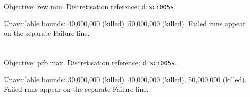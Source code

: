 \documentclass[a4paper,10pt]{article}
\begin{document}
\noindent\begin{minipage}{\linewidth}
\section*{\small\texttt{}}
Objective: rew min. Discretisation reference: \texttt{discr005s}.

\begin{minipage}[t]{0.48\linewidth}\centering

\end{minipage}
\hfill
\begin{minipage}[t]{0.48\linewidth}\centering

\end{minipage}
\par\medskip
Unavailable bounds: 40,000,000 (killed), 50,000,000 (killed). Failed runs appear on the separate Failure line.

\end{minipage}\par\bigskip
\noindent\begin{minipage}{\linewidth}
\section*{\small\texttt{}}
Objective: prb max. Discretisation reference: \texttt{discr005s}.

\begin{minipage}[t]{0.48\linewidth}\centering

\end{minipage}
\hfill
\begin{minipage}[t]{0.48\linewidth}\centering

\end{minipage}
\par\medskip
Unavailable bounds: 30,000,000 (killed), 40,000,000 (killed), 50,000,000 (killed). Failed runs appear on the separate Failure line.

\end{minipage}\par\bigskip
\clearpage
\end{document}
